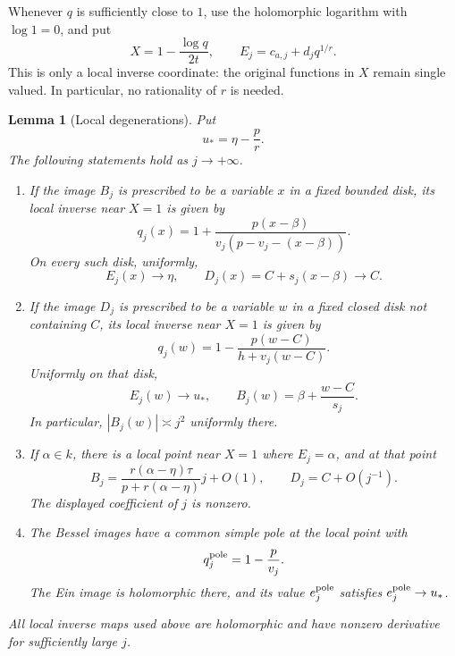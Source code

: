 \documentclass[11pt]{article}
\newtheorem{lemma}[theorem]{Lemma}
\theoremstyle{definition}
\theoremstyle{remark}
\begin{document}
Whenever $q$ is sufficiently close to $1$, use the holomorphic
logarithm with $\log 1=0$, and put
\[
 X=1-\frac{\log q}{2t},\qquad
 E_j=c_{a,j}+d_j q^{1/r}.
\]
This is only a local inverse coordinate: the original functions in
$X$ remain single valued.  In particular, no rationality of $r$ is
needed.

\begin{lemma}[Local degenerations]\label{fri:charts}
Put
\begin{equation}\label{fri:critical}
 u_* = \eta-\frac{p}{r}.
\end{equation}
The following statements hold as $j\to+\infty$.
\begin{enumerate}
\item If the image $B_j$ is prescribed to be a variable $x$ in a
fixed bounded disk, its local inverse near $X=1$ is given by
\begin{equation}\label{fri:beta-chart}
 q_j(x)=1+
 \frac{p(x-\beta)}{v_j(p-v_j-(x-\beta))}.
\end{equation}
On every such disk, uniformly,
\[
 E_j(x)\longrightarrow\eta,
 \qquad D_j(x)=C+s_j(x-\beta)\longrightarrow C.
\]
\item If the image $D_j$ is prescribed to be a variable $w$ in a
fixed closed disk not containing $C$, its local inverse near $X=1$
is given by
\begin{equation}\label{fri:C-chart}
 q_j(w)=1-\frac{p(w-C)}{h+v_j(w-C)}.
\end{equation}
Uniformly on that disk,
\[
 E_j(w)\longrightarrow u_*,
 \qquad B_j(w)=\beta+\frac{w-C}{s_j}.
\]
In particular, $|B_j(w)|\asymp j^2$ uniformly there.
\item If $\alpha\in k$, there is a local point near $X=1$ where
$E_j=\alpha$, and at that point
\begin{equation}\label{fri:eta-chart}
 B_j=
 \frac{r(\alpha-\eta)\tau}{p+r(\alpha-\eta)}j+O(1),
 \qquad D_j=C+O(j^{-1}).
\end{equation}
The displayed coefficient of $j$ is nonzero.
\item The Bessel images have a common simple pole at the local
point with
\begin{equation}\label{fri:pole-coordinate}
 q_j^{\rm pole}=1-\frac{p}{v_j}.
\end{equation}
The Ein image is holomorphic there, and its value $e_j^{\rm pole}$
satisfies $e_j^{\rm pole}\to u_*$.
\end{enumerate}
All local inverse maps used above are holomorphic and have nonzero
derivative for sufficiently large $j$.
\end{lemma}
\end{document}
